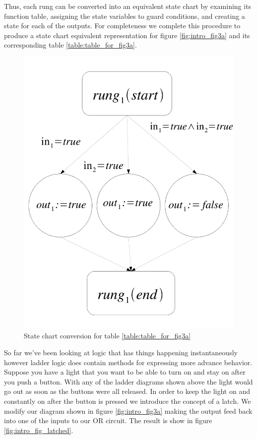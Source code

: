 Thus, each rung can be converted into an equivalent state chart by examining its 
function table, assigning the state variables to guard conditions, and creating a
state for each of the outputs. For completeness we complete this procedure to produce
a state chart equivalent representation for figure \ref{fig:intro_fig3a} and its
corresponding table \ref{table:table_for_fig3a}.


\begin{figure}[htp]
    \centering
    \includegraphics[width=\imgmedsmall]{./images/intro_or_graph_3a.pdf} %
    \caption{State chart conversion for table \ref{table:table_for_fig3a}}
    \label{fig:intro_or_graph_3a}
\end{figure}

So far we've been looking at logic that has things happening instantaneously however ladder logic does contain methods for expressing more advance behavior. Suppose you have a light that you want to be able to turn on and stay on after you push a button. With any of the ladder diagrams shown above the light would go out as soon as the buttons were all released. In order to keep the light on and constantly on after the button is pressed we introduce the concept of a latch. We modify our diagram shown in figure \ref{fig:intro_fig3a} making the output feed back into one of the inputs to our OR circuit. The result is show in figure \ref{fig:intro_fig_latched}.

